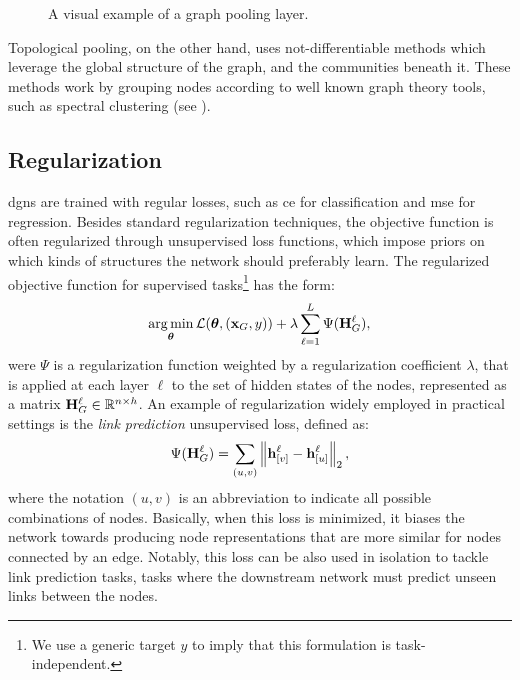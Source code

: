 \begin{figure}[h!]
    \centering
    \resizebox{.8\textwidth}{!}{}
    \caption{A visual example of a graph pooling layer.}
    \label{fig:pooling}
\end{figure}
Topological pooling, on the other hand,  uses not-differentiable methods which leverage the global structure of the graph, and the communities beneath it. These methods work by grouping nodes according to well known graph theory tools, such as spectral clustering (see \eg \citet{vonluxburg2007tutorialspectralclustering, dhillon2007weightedgraphcuts}).

\subsection{Regularization}
\glspl{dgn} are trained with regular losses, such as \gls{ce} for classification and \gls{mse} for regression. Besides standard regularization techniques, the objective function is often regularized through unsupervised loss functions, which impose priors on which kinds of
structures the network should preferably learn. The regularized objective function for supervised tasks\footnote{We use a generic target $y$ to imply that this formulation is task-independent.} has the form:
$$\argmin_{\Param} \Loss(\Param, (\Vector{x}_G, y)) + \lambda \sum_{\ell=1}^L \Psi(\Matrix{H}^{\ell}_G),$$
were $\Psi$ is a regularization function weighted by a regularization coefficient $\lambda$, that is applied at each layer $\ell$ to the set of hidden states of the nodes, represented as a matrix $\Matrix{h}_{G}^{\ell} \in \Real^{n \times h}$. An example of regularization widely employed in practical settings is the \emph{link prediction} unsupervised loss, defined as:
\begin{align}
    \Psi(\Matrix{H}^{\ell}_G) = \sum_{(u,v)} \Norm{\Elem{h}{v}^{\ell} - \Elem{h}{u}^{\ell}}_2,
\end{align}
where the notation $(u, v)$ is an abbreviation to indicate all possible combinations of nodes. Basically, when this loss is minimized, it biases the network towards producing node representations that are more similar for nodes connected by an edge. Notably, this loss can be also used in isolation to tackle link prediction tasks, \ie tasks where the downstream network must predict unseen links between the nodes.

